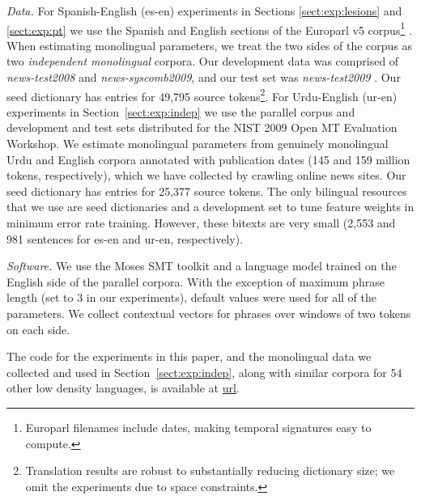 \documentclass[11pt]{article}
\newcommand{\secref}[1]{Section~\ref{#1}}
\newcommand{\figref}[1]{Figure~\ref{#1}}
\newcommand{\paraheader}[1]{\vskip 0.05in \noindent\emph{#1}}
\begin{document}
\paraheader{Data.} For Spanish-English (es-en) experiments in Sections \ref{sect:exp:lesions} and \ref{sect:exp:pt} we use the Spanish and English sections of the Europarl v5 corpus\footnote{Europarl filenames include dates, making temporal signatures easy to compute.} \cite{Koehn:2005}. When estimating monolingual parameters, we treat the two sides of the corpus as two {\em independent monolingual} corpora.  Our development data was comprised of {\em news-test2008} and {\em news-syscomb2009}, and our test set was {\em news-test2009} \cite{callisonburch-EtAl:2010:WMT}.  Our seed dictionary has entries for 49,795 source tokens\footnote{Translation results are robust to substantially reducing dictionary size; we omit the experiments due to space constraints.}.
For Urdu-English (ur-en) experiments in \secref{sect:exp:indep} we use the parallel corpus and development and test sets distributed for the NIST 2009 Open MT Evaluation Workshop.  We estimate monolingual parameters from genuinely monolingual Urdu and English corpora annotated with publication dates (145 and 159 million tokens, respectively), which we have collected by crawling online news sites.  %
Our seed dictionary has entries for 25,377 source tokens.
The only bilingual resources that we use are seed dictionaries and a development set to tune feature weights in minimum error rate training.  However, these bitexts are very small (2,553 and 981 sentences for es-en and ur-en, respectively).  

\paraheader{Software.} We use the Moses SMT toolkit \cite{Moses} and a language model trained on the English side of the parallel corpora.  With the exception of maximum phrase length (set to 3 in our experiments), default values were used for all of the parameters.  We collect contextual vectors for phrases over windows of two tokens on each side. %

\vskip 0.05in
The code for the experiments in this paper, and the monolingual data we collected and used in \secref{sect:exp:indep}, along with similar corpora for 54 other low density languages, is available at \url{url}.
\end{document}
